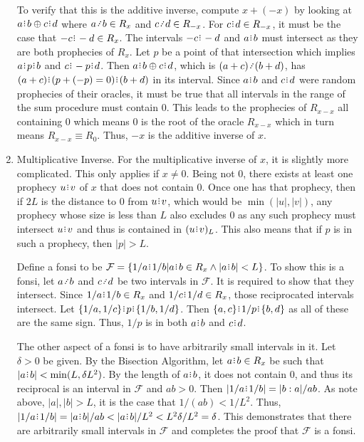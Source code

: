 \documentclass[12pt]{article}
\begin{document}
\begin{enumerate}
    To verify that this is the additive inverse, compute $x + (-x)$ by looking at $a\rint b \oplus c\rint d$ where $a \lte b \in R_x$ and $c \lte d \in R_{-x}$. For $c\rint d \in R_{-x}$, it must be the case that $-c\rint -d \in R_x$. The intervals $-c \rint  -d$ and $a\rint b$ must intersect as they are both prophecies of $R_x$. Let $p$ be a point of that intersection which implies $a\rint p\rint b$ and $c\rint -p\rint d$. Then $a\rint b \oplus c\rint d$, which is $(a+c) \lte (b+d)$, has $(a+c) \rint  ( p + (-p) =0 ) \rint  (b+d)$ in its interval. Since $a\rint b$ and $c\rint d$ were random prophecies of their oracles, it must be true that all intervals in the range of the sum procedure must contain 0. This leads to the prophecies of $R_{x-x}$ all containing 0 which means 0 is the root of the oracle $R_{x-x}$ which in turn means $R_{x-x} \equiv R_0$.  Thus, $-x$ is the additive inverse of $x$. 
    
    \item Multiplicative Inverse. For the multiplicative inverse of $x$, it is slightly more complicated. This only applies if $x \neq 0$. Being not 0, there exists at least one prophecy $u\rint v$ of $x$ that does not contain 0. Once one has that prophecy, then if $2L$ is the distance to 0 from $u\rint v$, which would be $\min(|u|, |v|)$, any prophecy whose size is less than $L$ also excludes 0 as any such prophecy must intersect $u \rint v$ and thus is contained in $\halo[L]{u \rint v}$. This also means that if $p$ is in such a prophecy, then $|p| > L$. 
    
    Define a fonsi to be $\mathcal{F} = \{1/a \rint  1/b | a\rint b \in R_x \wedge |a\rint b| < L \}$. To show this is a fonsi, let $a\lte b$ and $c \lte d$ be two intervals in $\mathcal{F}$. It is required to show that they intersect. Since $1/a\rint 1/b \in R_x$ and $1/c\rint 1/d \in R_x$, those reciprocated intervals intersect. Let $\{1/a, 1/c\} \rint  p \rint  \{1/b, 1/d\}$. Then $\{a, c\} \rint  1/p \rint  \{b, d\}$ as all of these are the same sign. Thus, $1/p$ is in both $a\rint b$ and $c\rint d$. 

    The other aspect of a fonsi is to have arbitrarily small intervals in it. Let $\delta > 0$ be given. By the Bisection Algorithm, let $a\rint b \in R_x$ be such that $|a\rint b| < \min(L, \delta L^2)$. By the length of $a\rint b$, it does not contain 0, and thus its reciprocal is an interval in $\mathcal{F}$ and $ab > 0$. Then $|1/a\rint  1/b| = |b:a|/ab$. As note above, $|a|, |b| > L$, it is the case that $1/(ab) < 1/L^2$. Thus, $|1/a\rint 1/b| = |a\rint b|/ab < |a\rint b|/L^2 < L^2 \delta/L^2 = \delta$. This demonstrates that there are arbitrarily small intervals in $\mathcal{F}$ and completes the proof that $\mathcal{F}$ is a fonsi. 
    

\end{enumerate}
\end{document}
